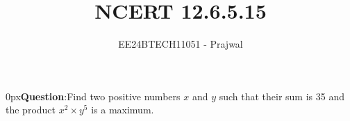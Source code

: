 \documentclass[journal]{IEEEtran}
\begin{document}

\vspace{3cm}

\title{NCERT 12.6.5.15}
\author{EE24BTECH11051 - Prajwal}
{\let\newpage\relax\maketitle}

\renewcommand{\thefigure}{\theenumi}
\renewcommand{\thetable}{\theenumi}
\setlength{\intextsep}{10pt} %

\parindent 0px\textbf{Question}:Find two positive numbers $x$ and $y$ such that their sum is 35 and the product $x^2\times y^5$
is a maximum.
\end{document}
